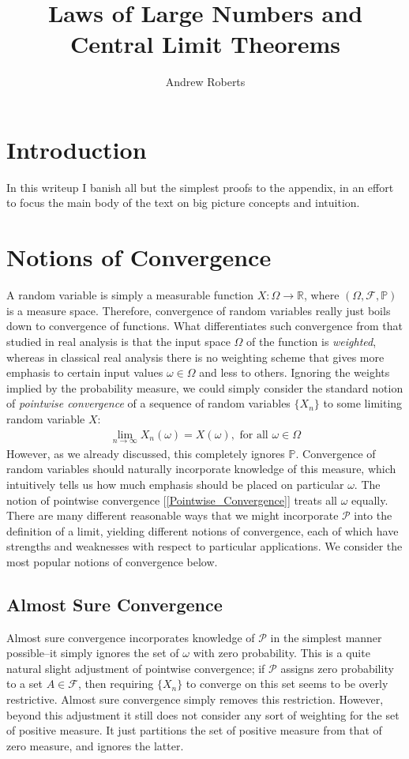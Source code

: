 \documentclass[12pt]{article}
\title{Laws of Large Numbers and Central Limit Theorems}
\author{Andrew Roberts}
\newcommand{\R}{\mathbb{R}}
\begin{document}
\maketitle
\tableofcontents
\newpage


\section{Introduction}
In this writeup I banish all but the simplest proofs to the appendix, in an effort to focus the main body of the text on big picture concepts and intuition. 

\section{Notions of Convergence}
A random variable is simply a measurable function $X: \Omega \to \R$, where $(\Omega, \mathcal{F}, \mathbb{P})$ is a measure space. Therefore, convergence of random variables
really just boils down to convergence of functions. What differentiates such convergence from that studied in real analysis is that the input space $\Omega$ of the function is \textit{weighted}, 
whereas in classical real analysis there is no weighting scheme that gives more emphasis to certain input values $\omega \in \Omega$ and less to others. Ignoring the weights implied by the 
probability measure, we could simply consider the standard notion of \textit{pointwise convergence} of a sequence of random variables $\{X_n\}$ to some limiting random variable $X$:
\begin{align}
\lim_{n \to \infty} X_n(\omega) = X(\omega), \text{ for all } \omega \in \Omega \label{Pointwise_Convergence}
\end{align}
However, as we already discussed, this completely ignores $\mathbb{P}$. Convergence of random variables should naturally incorporate knowledge of this measure, which intuitively tells us 
how much emphasis should be placed on particular $\omega$. The notion of pointwise convergence [\ref{Pointwise_Convergence}] treats all $\omega$ equally. There are many different reasonable
ways that we might incorporate $\mathcal{P}$ into the definition of a limit, yielding different notions of convergence, each of which have strengths and weaknesses with respect to particular applications. 
We consider the most popular notions of convergence below. 

\subsection{Almost Sure Convergence}
Almost sure convergence incorporates knowledge of $\mathcal{P}$ in the simplest manner possible--it simply ignores the set of $\omega$ with zero probability. This is a quite natural slight adjustment 
of pointwise convergence; if $\mathcal{P}$ assigns zero probability to a set $A \in \mathcal{F}$, then requiring $\{X_n\}$ to converge on this set seems to be overly restrictive. Almost sure convergence 
simply removes this restriction. However, beyond this adjustment it still does not consider any sort of weighting for the set of positive measure. It just partitions the set of positive measure from that of zero 
measure, and ignores the latter. 
\end{document}
